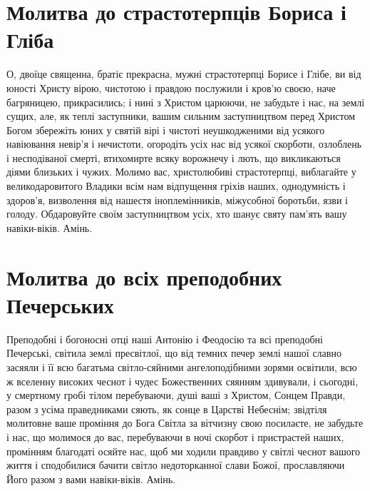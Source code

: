 \documentclass[chapters.tex]{subfiles}
\begin{document}
\section{Молитва до страстотерпців Бориса і Гліба}
О, двоїце священна, братіє прекрасна, мужні страстотерпці Борисе і Глібе, ви від юності Христу вірою, чистотою і правдою послужили і кров’ю своєю, наче багряницею, прикрасились; і нині з Христом царюючи, не забудьте і нас, на землі сущих, але, як теплі заступники, вашим сильним заступництвом перед Христом Богом збережіть юних у святій вірі і чистоті неушкодженими від усякого навіювання невір’я і нечистоти, огородіть усіх нас від усякої скорботи, озлоблень і несподіваної смерті, втихомирте всяку ворожнечу і лють, що викликаються діями близьких і чужих. Молимо вас, христолюбиві страстотерпці, виблагайте у великодаровитого Владики всім нам відпущення гріхів наших, однодумність і здоров’я, визволення від нашестя іноплемінників, міжусобної боротьби, язви і голоду. Обдаровуйте своїм заступництвом усіх, хто шанує святу пам’ять вашу навіки-віків. Амінь.

\section{Молитва до всіх преподобних Печерських}
Преподобні і богоносні отці наші Антонію і Феодосію та всі преподобні Печерські, світила землі пресвітлої, що від темних печер землі нашої славно засяяли і її всю багатьма світло-сяйними ангелоподібними зорями освітили, всю ж вселенну високих чеснот і чудес Божественних сяянням здивували, і сьогодні, у смертному гробі тілом перебуваючи, душі ваші з Христом, Сонцем Правди, разом з усіма праведниками сяють, як сонце в Царстві Небеснім; звідтіля молитовне ваше проміння до Бога Світла за вітчизну свою посилаєте, не забудьте і нас, що молимося до вас, перебуваючи в ночі скорбот і пристрастей наших, промінням благодаті осяйте нас, щоб ми ходили правдиво у світлі чеснот вашого життя і сподобилися бачити світло недоторканної слави Божої, прославляючи Його разом з вами навіки-віків. Амінь.
\end{document}
